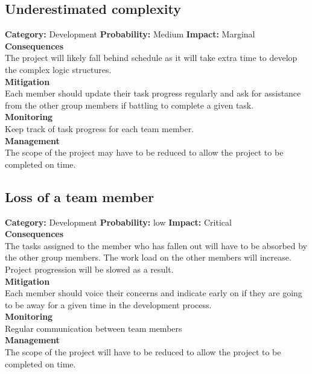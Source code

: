 \documentclass[a4paper,10pt]{article}
\begin{document}
\subsection{Underestimated complexity}
\textbf{Category:} Development\newline
\textbf{Probability:} Medium\newline
\textbf{Impact:} Marginal
\\\textbf{Consequences}\\
The project will likely fall behind schedule as it will take extra time to develop the complex logic structures. 
\smallskip\\\textbf{Mitigation}\\
Each member should update their task progress regularly and ask for assistance from the other group members if battling to complete a given task.
\smallskip\\\textbf{Monitoring}\\
Keep track of task progress for each team member.
\smallskip\\\textbf{Management}\\
The scope of the project may have to be reduced to allow the project to be completed on time. 

\subsection{Loss of a team member}
\textbf{Category:} Development\newline
\textbf{Probability:} low\newline
\textbf{Impact:} Critical
\\\textbf{Consequences}\\
The tasks assigned to the member who has fallen out will have to be absorbed by the other group members. The work load on the other members will increase. Project progression will be slowed as a result.
\smallskip\\\textbf{Mitigation}\\
Each member should voice their concerns and indicate early on if they are going to be away for a given time in the development process.
\smallskip\\\textbf{Monitoring}\\
Regular communication between team members
\smallskip\\\textbf{Management}\\
The scope of the project will have to be reduced to allow the project to be completed on time. 
\end{document}
